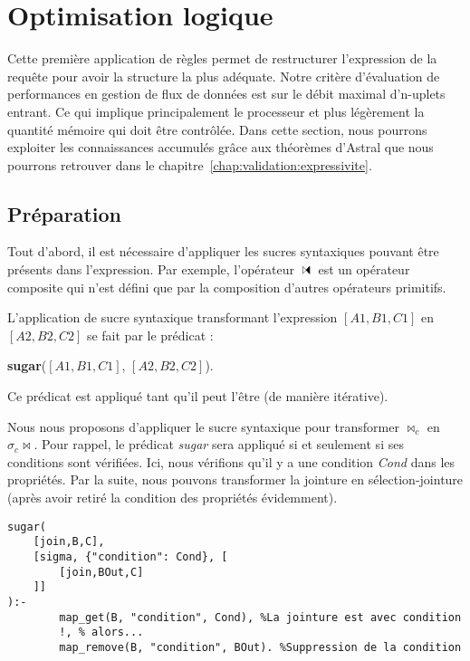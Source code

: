 \section{Optimisation logique}\label{sec:contrib:astronef:logique}
Cette première application de règles permet de restructurer l'expression de la requête pour avoir la structure la plus adéquate. Notre critère d'évaluation de performances en gestion de flux de données est sur le débit maximal d'n-uplets entrant. Ce qui implique principalement le processeur et plus légèrement la quantité mémoire qui doit être contrôlée. Dans cette section, nous pourrons exploiter les connaissances accumulés grâce aux théorèmes d'Astral que nous pourrons retrouver dans le chapitre~\ref{chap:validation:expressivite}.
\subsection{Préparation}
Tout d'abord, il est nécessaire d'appliquer les sucres syntaxiques pouvant être présents dans l'expression. Par exemple, l'opérateur $\ssjoin$ est un opérateur composite qui n'est défini que par la composition d'autres opérateurs primitifs.

\begin{regle}
L'application de sucre syntaxique transformant l'expression $[A1,B1,C1]$ en $[A2,B2,C2]$ se fait par le prédicat :
\begin{center} \textbf{sugar}($[A1,B1,C1]$, $[A2,B2,C2]$).\end{center}
Ce prédicat est appliqué tant qu'il peut l'être (de manière itérative).
\end{regle}

\begin{example}
	Nous nous proposons d'appliquer le sucre syntaxique pour transformer $\Join_c$ en $\sigma_c \Join$. Pour rappel, le prédicat \textit{sugar} sera appliqué si et seulement si ses conditions sont vérifiées. Ici, nous vérifions qu'il y a une condition \textit{Cond} dans les propriétés. Par la suite, nous pouvons transformer la jointure en sélection-jointure (après avoir retiré la condition des propriétés évidemment).
	\begin{lstlisting}
sugar(
	[join,B,C], 
	[sigma, {"condition": Cond}, [
		[join,BOut,C]
	]]
):-
    	map_get(B, "condition", Cond), %La jointure est avec condition
    	!, % alors...
    	map_remove(B, "condition", BOut). %Suppression de la condition
	\end{lstlisting}
\end{example}

